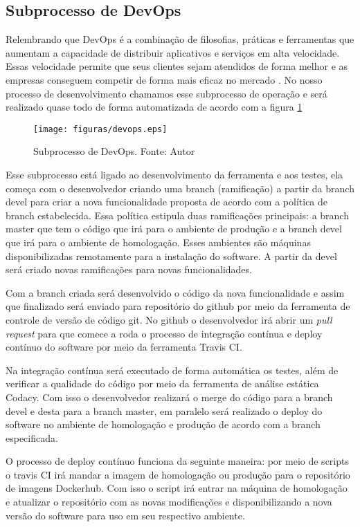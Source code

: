 \subsection{Subprocesso de DevOps}

Relembrando que DevOps é a combinação de filosofias, práticas e ferramentas que aumentam a capacidade de distribuir aplicativos e serviços em alta velocidade. Essas velocidade permite que seus clientes sejam atendidos de forma melhor e as empresas conseguem competir de forma mais eficaz no mercado \cite{amazon}. No nosso processo de desenvolvimento chamamos esse subprocesso de operação e será realizado quase todo de forma automatizada de acordo com a figura \ref{fig:devops}

\begin{figure}[h!]
	\centering
  \texttt{[image: figuras/devops.eps]}
  \caption[Subprocesso de DevOps.]{Subprocesso de DevOps. Fonte: Autor}
	\label{fig:devops}
\end{figure}

Esse subprocesso está ligado ao desenvolvimento da ferramenta e aos testes, ela começa com o desenvolvedor criando uma branch (ramificação) a partir da branch devel para criar a nova funcionalidade proposta de acordo com a política de branch estabelecida. Essa política estipula duas ramificações principais: a branch master que tem o código que irá para o ambiente de produção e a branch devel que irá para o ambiente de homologação. Esses ambientes são máquinas disponibilizadas remotamente para a instalação do software. A partir da devel será criado novas ramificações para novas funcionalidades.

Com a branch criada será desenvolvido o código da nova funcionalidade e assim que finalizado será enviado para repositório do github por meio da ferramenta de controle de versão de código git. No github o desenvolvedor irá abrir um \textit{pull request} para que comece a roda o processo de integração contínua e deploy contínuo do software por meio da ferramenta Travis CI.

Na integração contínua será executado de forma automática os testes, além de verificar a qualidade do código por meio da ferramenta de análise estática Codacy. Com isso o desenvolvedor realizará o merge do código para a branch devel e desta para a branch master, em paralelo será realizado o deploy do software no ambiente de homologação e produção de acordo com a branch especificada.

O processo de deploy contínuo funciona da seguinte maneira: por meio de scripts o travis CI irá mandar a imagem de homologação ou produção para o repositório de imagens Dockerhub. Com isso o script irá entrar na máquina de homologação e atualizar o repositório com as novas modificações e disponibilizando a nova versão do software para uso em seu respectivo ambiente.
